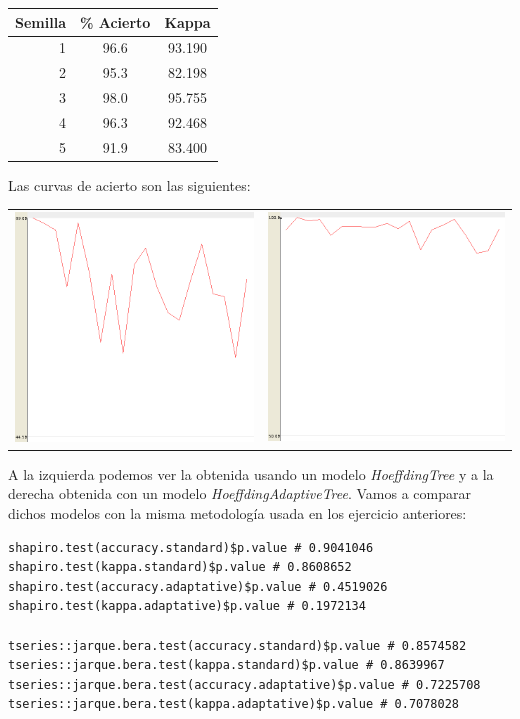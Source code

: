\documentclass[11pt]{article}
\begin{document}
\begin{table}[H]
	\centering
	\begin{tabular}{rcc}
		\textbf{Semilla} & \textbf{\% Acierto} & \textbf{Kappa} \\ \hline
		1 & 96.6 & 93.190 \\
		2 & 95.3 & 82.198 \\
		3 & 98.0 & 95.755 \\
		4 & 96.3 & 92.468 \\
		5 & 91.9 & 83.400
	\end{tabular}
\end{table}

Las curvas de acierto son las siguientes:

\begin{table}[H]
	\centering
	\begin{tabular}{cc}
	\includegraphics[width=0.4\linewidth]{2_4_1.png} & \includegraphics[width=0.4\linewidth]{2_4_2.png}
	\end{tabular}
\end{table}

A la izquierda podemos ver la obtenida usando un modelo \textit{HoeffdingTree} y a la derecha obtenida con un modelo \textit{HoeffdingAdaptiveTree}. Vamos a comparar dichos modelos con la misma metodología usada en los ejercicio anteriores:

\begin{lstlisting}
shapiro.test(accuracy.standard)$p.value # 0.9041046
shapiro.test(kappa.standard)$p.value # 0.8608652
shapiro.test(accuracy.adaptative)$p.value # 0.4519026
shapiro.test(kappa.adaptative)$p.value # 0.1972134

tseries::jarque.bera.test(accuracy.standard)$p.value # 0.8574582
tseries::jarque.bera.test(kappa.standard)$p.value # 0.8639967
tseries::jarque.bera.test(accuracy.adaptative)$p.value # 0.7225708
tseries::jarque.bera.test(kappa.adaptative)$p.value # 0.7078028
\end{lstlisting}
\end{document}
